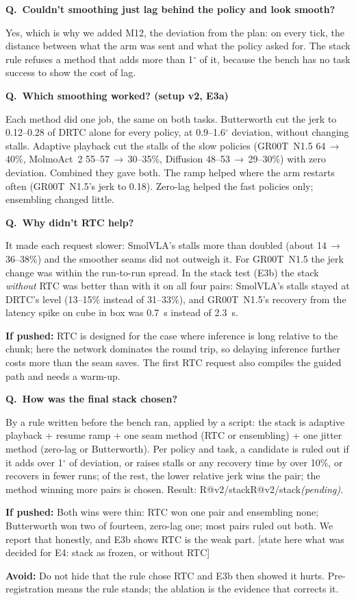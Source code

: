 \documentclass[11pt,a4paper]{article}
\makeatletter
\newcommand{\R}[1]{\ifcsname R@#1\endcsname\csname R@#1\endcsname\else\pending\fi}
\newcommand{\pending}{\textit{\color{warn}(pending)}}
\newcommand{\drtc}{DRTC}
\newcommand{\smolvla}{SmolVLA}
\newcommand{\groot}{GR00T~N1.5}
\newcommand{\degree}{$^\circ$}
\newcounter{qn}
\newcommand{\q}[2]{\stepcounter{qn}\par\medskip
  {\bfseries\color{accent}Q\theqn.\ #1}\par\nopagebreak[4]#2\par}
\newcommand{\push}[1]{\par{\small\color{muted}\textbf{If pushed:} #1}}
\newcommand{\trap}[1]{\par{\small\color{warn}\textbf{Avoid:} #1}}
\newcommand{\todo}[1]{{\color{warn}[#1]}}
\makeatother
\begin{document}
\q{Couldn't smoothing just lag behind the policy and look smooth?}{Yes, which is why we added M12, the deviation from
the plan: on every tick, the distance between what the arm was sent and what the policy asked for. The stack rule
refuses a method that adds more than 1\degree{} of it, because the bench has no task success to show the cost of lag.}

\q{Which smoothing worked? (setup v2, E3a)}{Each method did one job, the same on both tasks. Butterworth cut the jerk
to 0.12--0.28 of \drtc{} alone for every policy, at 0.9--1.6\degree{} deviation, without changing stalls. Adaptive
playback cut the stalls of the slow policies (\groot{} 64\,$\to$\,40\%, MolmoAct~2 55--57\,$\to$\,30--35\%, Diffusion
48--53\,$\to$\,29--30\%) with zero deviation. Combined they gave both. The ramp helped where the arm restarts often
(\groot's jerk to 0.18). Zero-lag helped the fast policies only; ensembling changed little.}

\q{Why didn't RTC help?}{It made each request slower: \smolvla's stalls more than doubled (about 14\,$\to$\,36--38\%)
and the smoother seams did not outweigh it. For \groot{} the jerk change was within the run-to-run spread. In the
stack test (E3b) the stack \emph{without} RTC was better than with it on all four pairs: \smolvla's stalls stayed at
\drtc's level (13--15\% instead of 31--33\%), and \groot's recovery from the latency spike on cube in box was 0.7~s
instead of 2.3~s.}
\push{RTC is designed for the case where inference is long relative to the chunk; here the network dominates the
round trip, so delaying inference further costs more than the seam saves. The first RTC request also compiles the
guided path and needs a warm-up.}

\q{How was the final stack chosen?}{By a rule written before the bench ran, applied by a script: the stack is adaptive
playback + resume ramp + one seam method (RTC or ensembling) + one jitter method (zero-lag or Butterworth). Per policy
and task, a candidate is ruled out if it adds over 1\degree{} of deviation, or raises stalls or any recovery time by
over 10\%, or recovers in fewer runs; of the rest, the lower relative jerk wins the pair; the method winning more pairs
is chosen. Result: \R{v2/stack}.}
\push{Both wins were thin: RTC won one pair and ensembling none; Butterworth won two of fourteen, zero-lag one; most
pairs ruled out both. We report that honestly, and E3b shows RTC is the weak part. \todo{state here what was decided
for E4: stack as frozen, or without RTC}}
\trap{Do not hide that the rule chose RTC and E3b then showed it hurts. Pre-registration means the rule stands; the
ablation is the evidence that corrects it.}
\end{document}
